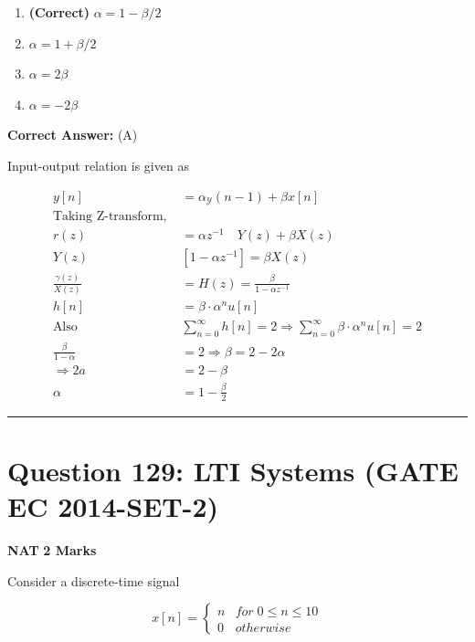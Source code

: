 \documentclass[11pt,a4paper]{article}
\begin{document}
\begin{enumerate}[label=(\Alph*)]
    \item \textbf{(Correct)} $\alpha=1-\beta/2$
    \item $\alpha=1+\beta/2$
    \item $\alpha=2\beta$
    \item $\alpha=-2\beta$
\end{enumerate}

\noindent \textbf{Correct Answer:} (A)

\begin{tcolorbox}[solbox, title=Detailed Solution -- Question 128]
Input-output relation is given as 

\[
\begin{aligned} y[n]&=\alpha_{\mathcal{Y}}(n-1)+\beta x[n] \\ \text{Taking Z-transform, }\\ r(z)&=\alpha z^{-1} \quad Y (z)+\beta X(z) \\ Y(z)&\left[1-\alpha z^{-1}\right]=\beta X(z) \\ \frac{\gamma(z)}{X(z)}&=H(z)=\frac{\beta}{1-\alpha z^{-1}} \\ h[n]&=\beta \cdot \alpha^{n} u[n] \\ \text{Also }&\sum_{n=0}^{\infty} h[n]=2 \Rightarrow \sum_{n=0}^{\infty} \beta \cdot \alpha^{n} u[n]=2 \\ \frac{\beta}{1-\alpha}&=2 \Rightarrow \beta=2-2 \alpha \\ \Rightarrow 2 a &=2-\beta \\ \alpha &=1-\frac{\beta}{2} \end{aligned}
\]
\end{tcolorbox}

\vspace{1.5em}
\hrule
\vspace{1.5em}

\section*{Question 129: LTI Systems (GATE EC 2014-SET-2)}
\noindent \textbf{\color{primary}NAT} \hfill \textbf{\color{secondary}2 Marks}


\noindent Consider a discrete-time signal 
 
\[
x[n]=\left\{\begin{matrix} n & for \; 0\leq n\leq 10\\ 0&otherwise \end{matrix}\right.
\]
\end{document}
